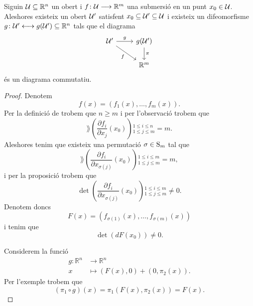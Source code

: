\documentclass[../../Main.tex]{subfiles}
\begin{document}
	\begin{theorem}
		\label{thm:Teorema d'estructura local de les submersions}
		Siguin \(\mathcal{U}\subseteq\mathbb{R}^{n}\) un obert i \(f\colon\mathcal{U}\longrightarrow\mathbb{R}^{m}\) una submersió en un punt \(x_{0}\in\mathcal{U}\). Aleshores existeix un obert \(\mathcal{U}'\) satisfent \(x_{0}\subseteq\mathcal{U}'\subseteq\mathcal{U}\) i existeix un difeomorfisme \(g\colon\mathcal{U}'\longleftrightarrow g(\mathcal{U}')\subseteq\mathbb{R}^{n}\) tals que el diagrama
		\[\begin{tikzcd}
			\obert{U}' \arrow{r}{g} \arrow[swap]{dr}{f} & g(\obert{U}') \arrow{d}{\pi} \\
			& \mathbb{R}^{m}
		\end{tikzcd}\]
		és un diagrama commutatiu.
		\begin{proof}
			Denotem
			\[
			    f(x)=(f_{1}(x),\dots,f_{m}(x)).
			\]
			Per la definició de  trobem que \(n\geq m\) i per l'observació  trobem que
			\[
			    \rang\left(\frac{\partial f_{i}}{\partial x_{j}}(x_{0})\right){}_{1\leq j\leq m}^{1\leq i\leq n}=m.
			\]
			Aleshores tenim que existeix una permutació \(\sigma\in\operatorname{S}_{m}\) tal que
			\[
			    \rang\left(\frac{\partial f_{i}}{\partial x_{\sigma(j)}}(x_{0})\right){}_{1\leq j\leq m}^{1\leq i\leq m}=m,
			\]
			i per la proposició  trobem que
			\[
			    \det\left(\frac{\partial f_{i}}{\partial x_{\sigma(j)}}(x_{0})\right){}_{1\leq j\leq m}^{1\leq i\leq m}\neq0.
			\]
			Denotem doncs
			\[
			    F(x)=(f_{\sigma(1)}(x),\dots,f_{\sigma(m)}(x))
			\]
			i tenim que
			\begin{equation}
				\label{thm:Teorema d'estructura local de les submersions:eq:1}
				\det(dF(x_{0}))\neq0.
			\end{equation}
			
			Considerem la funció
			\begin{align*}
				g\colon\mathbb{R}^{n}&\longrightarrow\mathbb{R}^{n} \\
				x&\longmapsto(F(x),0)+(0,\pi_{2}(x)).
			\end{align*}
			Per l'exemple  trobem que
			\[
			    (\pi_{1}\circ g)(x)=\pi_{1}(F(x),\pi_{2}(x))=F(x).
			\]
			

\end{proof}
\end{theorem}
\end{document}
